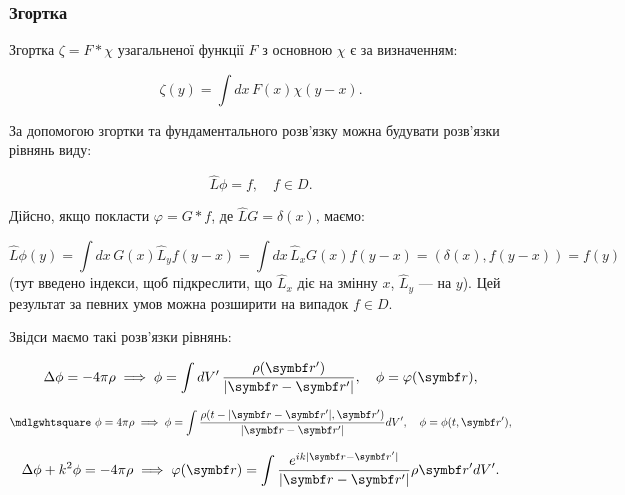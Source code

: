 \subsubsection{Згортка}

Згортка \( \zeta = F * \chi \) узагальненої функції \( F \) з основною \( \chi \) є за визначенням:

\begin{equation}
\zeta(y) = \int dx \, F(x) \chi(y - x).
\label{eq:convolution}
\end{equation}

За допомогою згортки та фундаментального розв’язку можна будувати розв’язки рівнянь виду:

\begin{equation}
\hat{L} \phi = f, \quad f \in D.
\end{equation}

Дійсно, якщо покласти \( \varphi = G * f \), де \( \hat{L} G = \delta(x) \), маємо:

\begin{equation*}
\hat{L}\phi(y) = \int dx \, G(x) \hat{L}_y f(y - x) = \int dx \, \hat{L}_x G(x) f(y - x) = (\delta(x), f(y - x)) = f(y)
\end{equation*}
(тут введено індекси, щоб підкреслити, що \( \hat{L}_x \) діє на змінну \( x \), \( \hat{L}_y \) --- на \( y \)). Цей результат за певних умов можна
розширити на
випадок \( f \in D \).

Звідси маємо такі розв’язки рівнянь:

\begin{equation}
\Delta \phi = -4\pi \rho \implies \phi = \int dV' \, \frac{\rho(\vect{r}')}{|\vect{r} - \vect{r}'|}, \quad \phi = \varphi(\vect{r}),
\end{equation}

\begin{equation}
\Dalambertian \phi = 4\pi \rho \implies \phi = \int \frac{\rho(t - |\vect{r} - \vect{r}'|, \vect{r}')}{|\vect{r} - \vect{r}'|} dV' ,
\quad
\phi = \phi(t, \vect{r}'),
\end{equation}

\begin{equation}
\Delta \phi + k^2 \phi = -4\pi \rho \implies \varphi(\vect{r}) = \int \frac{e^{ik|\vect{r} - \vect{r}'|}}{|\vect{r} - \vect{r}'|}
\rho{\vect{r}'}
dV'.
\end{equation}

